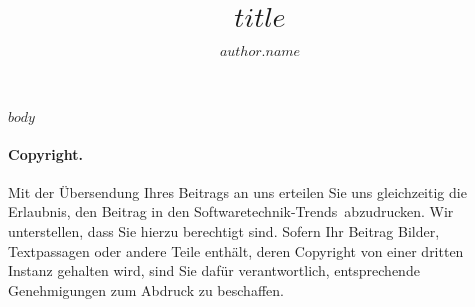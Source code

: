 \documentclass[
    $if(classoption)$
    $for(classoption)$$classoption$$sep$,$endfor$
    $endif$
]{$documentclass$}
\title{$title$}
\author[$author.index$]{$author.name$ \orcidlink{$author.orcid$}}
\affil[$author.index$]{$author.affiliation$}
\date{}
\newcommand{\stt}{Soft\-ware\-tech\-nik-Trends}
\begin{document}
    \maketitle



    $body$

\paragraph{Copyright.}

Mit der Übersendung Ihres Beitrags an uns erteilen Sie uns gleichzeitig die Erlaubnis,
den Beitrag in den \stt\ abzudrucken. Wir unterstellen, dass Sie hierzu berechtigt sind.
Sofern Ihr Beitrag Bilder, Textpassagen oder andere Teile enthält, deren Copyright
von einer dritten Instanz gehalten wird, sind Sie dafür verantwortlich,
entsprechende Genehmigungen zum Abdruck zu beschaffen.


\printbibliography
\end{document}
